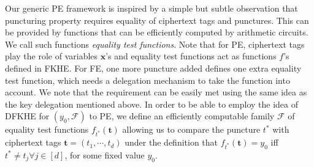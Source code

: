 \documentclass[runningheads,10pt]{llncs}
\begin{document}
 Our generic PE framework is inspired by a simple but subtle observation that puncturing property
 requires equality of ciphertext tags and punctures.
This can be provided by functions that can be efficiently computed by arithmetic circuits.
 We call such functions \textit{equality test functions}. 
Note that for PE, ciphertext tags play the role of variables $\textbf{x}$'s and equality test functions act as functions $f$'s  
defined in FKHE. 
For FE, one more puncture added defines one extra equality test function,
which needs a delegation mechanism to take the function into account. 
We note that the requirement can be 
easily met using the same idea as the key delegation mentioned above.
In order to be able to employ the idea of DFKHE for $(y_0, \mathcal{F})$ to PE, 
we define an efficiently computable family $\mathcal{F}$ of equality test functions $f_{t^*}(\mathbf{t})$ allowing us to compare the puncture $t^*$ with ciphertext tags $\mathbf{t}=(t_1, \cdots, t_d)$ under the definition that $f_{t^*}(\mathbf{t})=y_0$ iff $t^* \neq t_j \forall j\in [d]$, for some fixed value $y_0$. 
\end{document}
